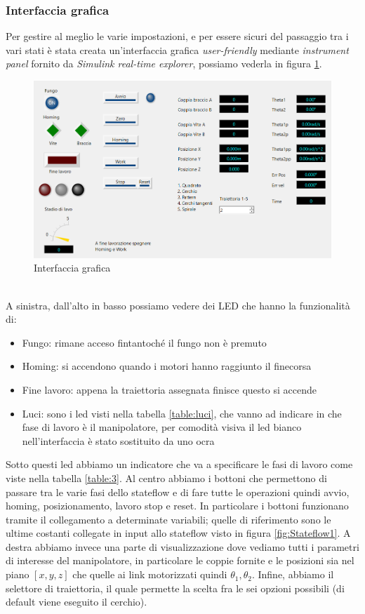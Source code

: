\subsubsection{Interfaccia grafica}
Per gestire al meglio le varie impostazioni, e per essere sicuri del passaggio tra i vari stati è stata creata un'interfaccia grafica \textit{user-friendly} mediante \textit{instrument panel} fornito da \textit{Simulink real-time explorer}, possiamo vederla in figura \ref{fig:gui}.
\begin{figure}[ht]
	\begin{center}
		\includegraphics[scale=0.6]{Immagini/Sperimentale/GUI2}
		\caption{Interfaccia grafica}
		\label{fig:gui}
	\end{center}
\end{figure}
\\A sinistra, dall'alto in basso possiamo vedere dei LED che hanno la funzionalità di:
\begin{itemize}
	\item Fungo: rimane acceso fintantoché il fungo non è premuto
	\item Homing: si accendono quando i motori hanno raggiunto il finecorsa
	\item Fine lavoro: appena la traiettoria assegnata finisce questo si accende
	\item Luci: sono i led visti nella tabella \ref{table:luci}, che vanno ad indicare in che fase di lavoro è il manipolatore, per comodità visiva il led bianco nell'interfaccia è stato sostituito da uno ocra
\end{itemize} 
Sotto questi led abbiamo un indicatore che va a specificare le fasi di lavoro come viste nella tabella \ref{table:3}. Al centro abbiamo i bottoni che permettono di passare tra le varie fasi dello stateflow e di fare tutte le operazioni quindi avvio, homing, posizionamento, lavoro stop e reset. In particolare i bottoni funzionano tramite il collegamento a determinate variabili; quelle di riferimento sono le ultime costanti collegate in input allo stateflow visto in figura \ref{fig:Stateflow1}. A destra abbiamo invece una parte di visualizzazione dove vediamo tutti i parametri di interesse del manipolatore, in particolare le coppie fornite e le posizioni sia nel piano $[x,y,z]$ che quelle ai link motorizzati quindi $\theta_1,\theta_2$. Infine, abbiamo il selettore di traiettoria, il quale permette la scelta fra le sei opzioni possibili (di default viene eseguito il cerchio).

